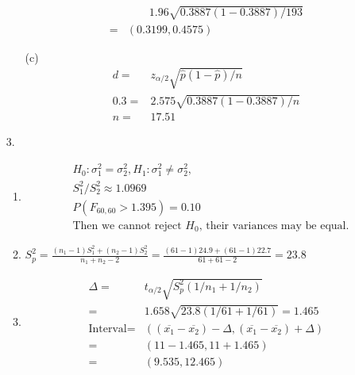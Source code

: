 \documentclass{article}
\begin{document}
\begin{enumerate}
\begin{enumerate}
\begin{equation*}
\begin{aligned}
            & \qquad 1.96 \sqrt{0.3887 (1 - 0.3887) / 193} \\
            =& (0.3199, 0.4575)
        \end{aligned}
        \end{equation*}
    \item [(c)]
        \begin{equation*}
        \begin{aligned}
        d =& z_{\alpha / 2} \sqrt{\hat{p} (1 - \hat{p}) / n} \\
        0.3 =& 2.575 \sqrt{0.3887 (1 - 0.3887) / n} \\
        n =& 17.51
        \end{aligned}
        \end{equation*}
    \end{enumerate}
\item [3.]
    \begin{enumerate}
        \item
            \begin{equation*}
            \begin{aligned}
                & H_0: \sigma_1^2 = \sigma_2^2, H_1: \sigma_1^2 \neq \sigma_2^2,  \\
                & S_1^2 / S_2^2 \approx 1.0969 \\
                & P(F_{60, 60} > 1.395) = 0.10 \\
                & \text{Then we cannot reject }H_0\text{, their variances may be equal}.
            \end{aligned}
            \end{equation*}
        \item $S^2_p = \frac{(n_1 - 1)S^2_1 + (n_2 - 1)S^2_2}{n_1 + n_2 - 2} = \frac{(61 - 1)24.9 + (61 - 1)22.7}{61 + 61 - 2} = 23.8$
        \item
            \begin{equation*}
            \begin{aligned}
            \Delta =& t_{\alpha / 2} \sqrt{S^2_p(1 / n_1 + 1 / n_2)} \\
                =& 1.658 \sqrt{23.8 (1 / 61 + 1 / 61)} = 1.465\\
            \text{Interval} =& ((\overbar{x_1} - \overbar{x_2}) - \Delta, (\overbar{x_1} - \overbar{x_2}) + \Delta) \\
                =& (11 - 1.465, 11 + 1.465) \\
                =& (9.535, 12.465)
            \end{aligned}

\end{equation*}
\end{enumerate}
\end{enumerate}
\end{document}

